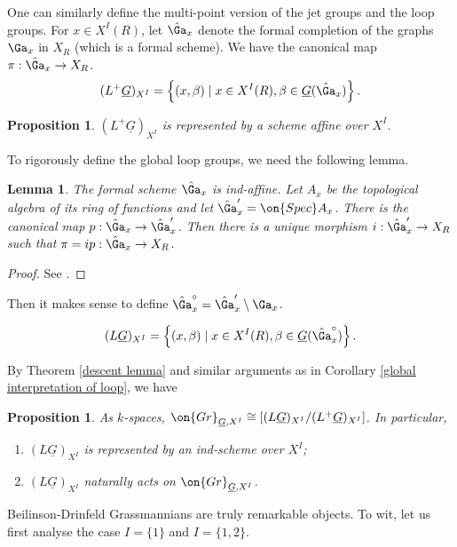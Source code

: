 \documentclass[]{pcmi}
\theoremstyle{plain}
\newtheorem{prop}[equation]{Proposition}
\newtheorem{lem}[equation]{Lemma}
\theoremstyle{remark}
\theoremstyle{definition}
\newcommand{\Gr}{{\on{Gr}}}
\newcommand{\Spec}{\on{Spec}}
\begin{document}
One can similarly define the multi-point version of the jet groups and the loop groups. For $x\in X^I(R)$, let $\hat{\Ga}_x$ denote the formal completion of the graphs $\Ga_x$ in $X_R$ (which is a formal scheme). We have the canonical map $\pi:\hat{\Ga}_x\to X_R$.
\begin{equation}
(L^+\underline G)_{X^I}=\left\{(x,\beta)\mid x\in X^I(R), \beta\in
\underline{G}(\hat{\Ga}_x)\right\}.
\end{equation}
\begin{prop}
$(L^+\underline{G})_{X^I}$ is represented by a scheme affine over $X^I$.
\end{prop}

To rigorously define the global loop groups, we need the following lemma. 
\begin{lem}The formal scheme $\hat{\Ga}_x$ is ind-affine. Let $A_x$ be the topological algebra of its ring of functions and let $\hat{\Ga}'_x=\Spec A_x$. There is the canonical map $p:\hat{\Ga}_x\to\hat{\Ga}'_x$. Then there is a unique morphism $i: \hat{\Ga}'_x\to X_R$ such that $\pi=ip:\hat{\Ga}_x\to X_R$.
\end{lem}
\begin{proof}
See \cite[Proposition 2.12.6]{BD}.
\end{proof}
Then it makes sense to define $\hat{\Ga}_x^\circ=\hat{\Ga}'_x\setminus \Ga_x$.

\begin{equation}
(L\underline G)_{X^I}=\left\{(x,\beta)\mid x\in X^I(R), \beta\in
\underline G(\hat{\Ga}^\circ_x)\right\}.
\end{equation}

By Theorem \ref{descent lemma} and similar arguments as in Corollary \ref{global interpretation of loop}, we have
\begin{prop}
As $k$-spaces, $\Gr_{\underline G,X^I}\cong[(L\underline G)_{X^I}/(L^+\underline G)_{X^I}]$. In particular,
\begin{enumerate}
\item  $(L\underline G)_{X^I}$ is represented by an ind-scheme over $X^I$; 

\item $(L\underline G)_{X^I}$ naturally acts on $\Gr_{\underline G,X^I}$.
\end{enumerate}
\end{prop}





Beilinson-Drinfeld Grassmannians are truly remarkable objects. To wit, let us first analyse the case $I=\{1\}$ and $I=\{1,2\}$. 
\end{document}
